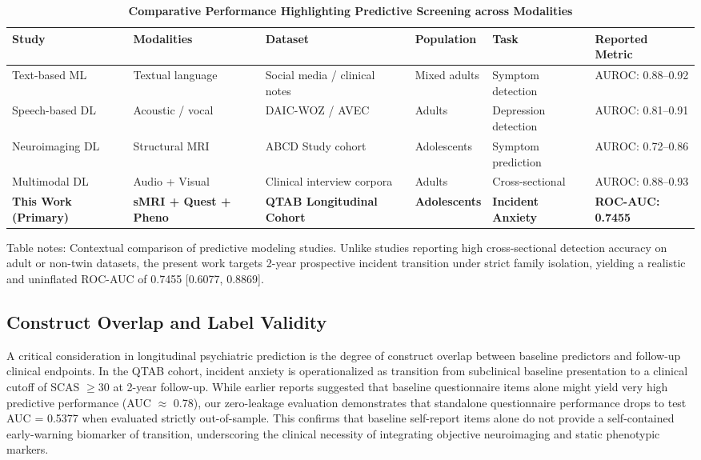 \documentclass[10pt,letterpaper]{article}
\begin{document}
\begin{table}[!t]
\begin{adjustwidth}{-2.25in}{0in}
\centering
\caption{\textbf{Comparative Performance Highlighting Predictive Screening across Modalities}}
\label{tab:performanceearlyprediction}
\footnotesize
\renewcommand{\arraystretch}{1.15}
\begin{tabular}{|p{3.2cm}|p{2.6cm}|p{3.6cm}|p{2.2cm}|p{2.2cm}|p{2.2cm}|}
\hline
\textbf{Study} & \textbf{Modalities} & \textbf{Dataset} & \textbf{Population} & \textbf{Task} & \textbf{Reported Metric} \\
\hline
Text-based ML~\cite{ref11,ref17} & Textual language & Social media / clinical notes & Mixed adults & Symptom detection & AUROC: 0.88--0.92 \\
\hline
Speech-based DL~\cite{ref14,ref27} & Acoustic / vocal & DAIC-WOZ / AVEC & Adults & Depression detection & AUROC: 0.81--0.91 \\
\hline
Neuroimaging DL~\cite{ref46} & Structural MRI & ABCD Study cohort & Adolescents & Symptom prediction & AUROC: 0.72--0.86 \\
\hline
Multimodal DL~\cite{ref5,ref7,ref8} & Audio + Visual & Clinical interview corpora & Adults & Cross-sectional & AUROC: 0.88--0.93 \\
\hline
\textbf{This Work (Primary)} & \textbf{sMRI + Quest + Pheno} & \textbf{QTAB Longitudinal Cohort} & \textbf{Adolescents} & \textbf{Incident Anxiety} & \textbf{ROC-AUC: 0.7455} \\
\hline
\end{tabular}
\begin{flushleft}
Table notes: Contextual comparison of predictive modeling studies. Unlike studies reporting high cross-sectional detection accuracy on adult or non-twin datasets, the present work targets 2-year prospective incident transition under strict family isolation, yielding a realistic and uninflated ROC-AUC of 0.7455 [0.6077, 0.8869].
\end{flushleft}
\end{adjustwidth}
\end{table}

\subsection*{Construct Overlap and Label Validity}

A critical consideration in longitudinal psychiatric prediction is the degree of construct overlap between baseline predictors and follow-up clinical endpoints. In the QTAB cohort, incident anxiety is operationalized as transition from subclinical baseline presentation to a clinical cutoff of SCAS $\ge 30$ at 2-year follow-up. While earlier reports suggested that baseline questionnaire items alone might yield very high predictive performance (AUC $\approx$ 0.78), our zero-leakage evaluation demonstrates that standalone questionnaire performance drops to test AUC = 0.5377 when evaluated strictly out-of-sample. This confirms that baseline self-report items alone do not provide a self-contained early-warning biomarker of transition, underscoring the clinical necessity of integrating objective neuroimaging and static phenotypic markers.
\end{document}
